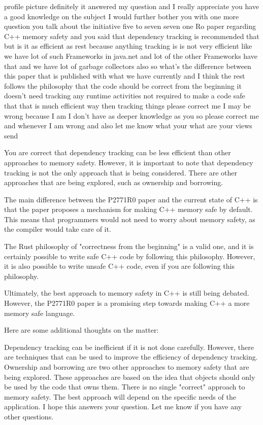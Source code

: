 \documentclass[11pt]{article}
\begin{document}
profile picture
definitely it answered my question and I really appreciate you have a good knowledge on the subject
I would further bother you with one more question you talk about the initiative five to seven seven one Ro paper
regarding C++ memory safety
and you said that dependency tracking is recommended that but
is it as efficient as rest because
anything tracking
is
is not very efficient like we have lot of such Frameworks in java.net and lot of the other Frameworks
have that and we have lot of
garbage collectors also so
what's the difference between this
paper that is
published with
what we have currently and
I think the rest follows the
philosophy that
the code should be
correct from the beginning
it doesn't need tracking
any runtime activities not required to
make a code safe
that that is much efficient way
then
tracking things please correct me I may be wrong because I am I don't have as deeper knowledge as you so please correct me and whenever I am wrong and also let me know what your what are your views send

You are correct that dependency tracking can be less efficient than other approaches to memory safety. However, it is important to note that dependency tracking is not the only approach that is being considered. There are other approaches that are being explored, such as ownership and borrowing.

The main difference between the P2771R0 paper and the current state of C++ is that the paper proposes a mechanism for making C++ memory safe by default. This means that programmers would not need to worry about memory safety, as the compiler would take care of it.

The Rust philosophy of "correctness from the beginning" is a valid one, and it is certainly possible to write safe C++ code by following this philosophy. However, it is also possible to write unsafe C++ code, even if you are following this philosophy.

Ultimately, the best approach to memory safety in C++ is still being debated. However, the P2771R0 paper is a promising step towards making C++ a more memory safe language.

Here are some additional thoughts on the matter:

Dependency tracking can be inefficient if it is not done carefully. However, there are techniques that can be used to improve the efficiency of dependency tracking.
Ownership and borrowing are two other approaches to memory safety that are being explored. These approaches are based on the idea that objects should only be used by the code that owns them.
There is no single "correct" approach to memory safety. The best approach will depend on the specific needs of the application.
I hope this answers your question. Let me know if you have any other questions.
\end{document}
